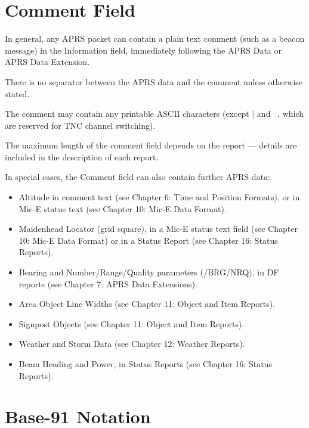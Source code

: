 


\clearpage


\section{Comment Field}

In general, any APRS packet can contain a plain text comment (such as a
beacon message) in the Information field, immediately following the APRS
Data or APRS Data Extension.

There is no separator between the APRS data and the comment unless
otherwise stated.

The comment may contain any printable ASCII characters (except | and ~,
which are reserved for TNC channel switching).

The maximum length of the comment field depends on the report — details
are included in the description of each report.

In special cases, the Comment field can also contain further APRS data:

\begin{itemize}


\item Altitude in comment text (see Chapter 6: Time and Position Formats), or
in Mic-E status text (see Chapter 10: Mic-E Data Format).

\item Maidenhead Locator (grid square), in a Mic-E status text field (see
Chapter 10: Mic-E Data Format) or in a Status Report (see Chapter 16:
Status Reports).

\item Bearing and Number/Range/Quality parameters (/BRG/NRQ), in DF
reports (see Chapter 7: APRS Data Extensions).

\item Area Object Line Widths (see Chapter 11: Object and Item Reports).

\item Signpost Objects (see Chapter 11: Object and Item Reports).

\item Weather and Storm Data (see Chapter 12: Weather Reports).

\item Beam Heading and Power, in Status Reports (see Chapter 16: Status
Reports).

\end{itemize}

\section{Base-91 Notation}

